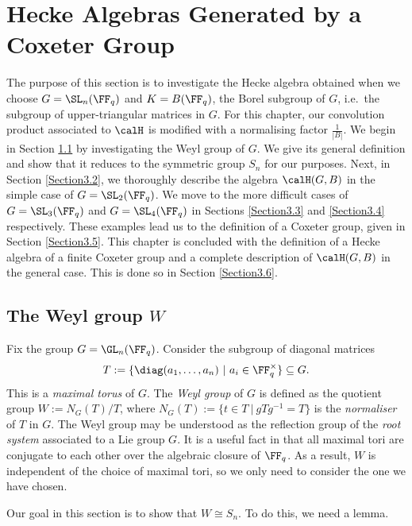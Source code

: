 \documentclass[11pt]{amsart}
\theoremstyle{remark}
\begin{document}

\newpage
\section{Hecke Algebras Generated by a Coxeter Group}\label{Chapter3}
The purpose of this section is to investigate the Hecke algebra obtained when we choose $G=\SL_n(\FF_q)$ and $K=B(\FF_q)$, the Borel subgroup of $G$, i.e.\ the subgroup of upper-triangular matrices in $G$.
For this chapter, our convolution product associated to $\calH$ is modified with a normalising factor $\frac{1}{|B|}$.
We begin in Section \ref{Section3.1} by investigating the Weyl group of $G$.
We give its general definition and show that it reduces to the symmetric group $S_n$ for our purposes.
Next, in Section \ref{Section3.2}, we thoroughly describe the algebra $\calH(G,B)$ in the simple case of $G=\SL_2(\FF_q)$.
We move to the more difficult cases of $G=\SL_3(\FF_q)$ and $G=\SL_4(\FF_q)$ in Sections \ref{Section3.3} and \ref{Section3.4} respectively.
These examples lead us to the definition of a Coxeter group, given in Section \ref{Section3.5}.
This chapter is concluded with the definition of a Hecke algebra of a finite Coxeter group and a complete description of $\calH(G,B)$ in the general case.
This is done so in Section \ref{Section3.6}.


\subsection{The Weyl group $W$}\label{Section3.1}
Fix the group $G=\GL_n(\FF_q)$.
Consider the subgroup of diagonal matrices
\[
	T := \{\diag(a_1,\ldots,a_n)\ |\ a_i\in\FF_q^\times\}\subseteq G.
\]
This is a \emph{maximal torus} of $G$.
The \emph{Weyl group} of $G$ is defined as the quotient group $W := N_G(T)/T$, where $N_G(T) := \{t\in T\ |\ gTg^{-1}=T\}$ is the \emph{normaliser} of $T$ in $G$.
The Weyl group may be understood as the reflection group of the \emph{root system} associated to a Lie group $G$.
It is a useful fact in \cite{Brocker85} that all maximal tori are conjugate to each other over the algebraic closure of $\FF_q$.
As a result, $W$ is independent of the choice of maximal tori, so we only need to consider the one we have chosen.

Our goal in this section is to show that $W\cong S_n$.
To do this, we need a lemma.
\end{document}
